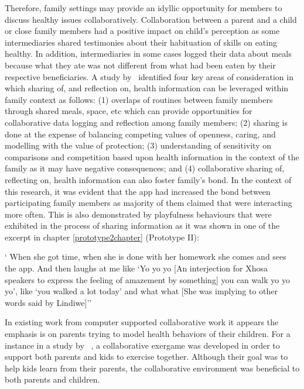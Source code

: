 Therefore, family settings may provide an idyllic opportunity for members to discuss healthy issues collaboratively. Collaboration between a parent and a child or close family members had a positive impact on child's perception as some intermediaries shared testimonies about their habituation of skills on eating healthy. In addition, intermediaries in some cases logged their data about meals because what they ate was not different from what had been eaten by their respective beneficiaries. A study by~\cite{grimes2009toward} identified four key areas of consideration in which sharing of, and reflection on, health information can be leveraged within family context as follows: (1) overlaps of routines between family members through shared meals, space, etc which can provide opportunities for collaborative data logging and reflection among family members; (2) sharing is done at the expense of balancing competing values of openness, caring, and modelling with the value of protection; (3) understanding of sensitivity on comparisons and competition based upon health information in the context of the family as it may have negative consequences; and (4) collaborative sharing of, reflecting on, health information can also foster family's bond. In the context of this research, it was evident that the app had increased the bond between participating family members as majority of them claimed that were interacting more often. This is also demonstrated by playfulness behaviours that were exhibited in the process of sharing information as it was shown in one of the excerpt in chapter \ref{prototype2chapter} (Prototype II):

 {` When she got time, when she is done with her homework she comes and sees the app. And then laughs at me like `Yo yo yo [An interjection for Xhosa speakers to express the feeling of amazement by something] you can walk yo yo yo', like `you walked a lot today' and what what [She was implying to other words said by Lindiwe]''}

In existing work from computer supported collaborative work it appears the emphasis is on parents trying to model health behaviors of their children.  For a instance in a study by ~\cite{saksono2015spaceship}, a collaborative exergame was developed in order to support both parents and kids to exercise together. Although their goal was to help kids learn from their parents, the collaborative environment was beneficial to both parents and children.

